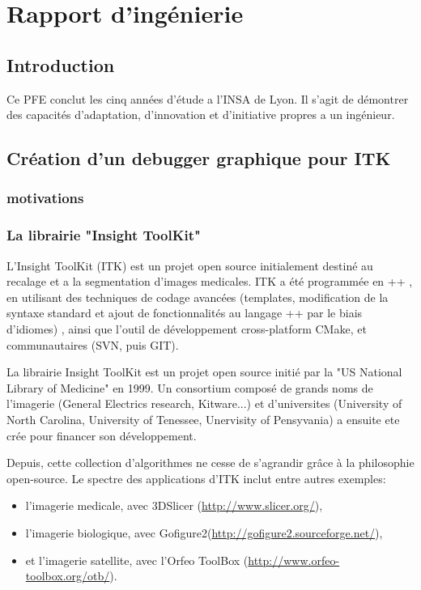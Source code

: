 

\chapter{Rapport d'ingénierie} 






\section{Introduction}

Ce PFE conclut les cinq années d'étude a l'INSA de Lyon. Il s'agit de démontrer des capacités d'adaptation, d'innovation et d'initiative propres a un ingénieur.
 
 
 
\section{Création d'un debugger graphique pour ITK}

\subsection{motivations}





\subsection{La librairie "Insight ToolKit"}
L'Insight ToolKit (ITK) est un projet open source initialement destiné au recalage et a la segmentation d'images medicales. ITK a été programmée en \C++ , en utilisant des techniques de codage avancées (templates, modification de la syntaxe standard et ajout de fonctionnalités au langage \C++ par le biais d'idiomes) , ainsi que l'outil de développement cross-platform CMake, et communautaires (SVN, puis GIT).

La librairie Insight ToolKit est un projet open source initié par la "US National Library of Medicine" en 1999. Un consortium composé de grands noms de l'imagerie (General Electrics research, Kitware...) et d'universites (University of North Carolina, University of Tenessee, Unervisity of Pensyvania) a ensuite ete crée pour financer son développement.

Depuis, cette collection d'algorithmes ne cesse de s'agrandir grâce à la philosophie open-source. Le spectre des applications d'ITK inclut entre autres exemples:  
\begin{itemize}
  \item l'imagerie medicale, avec 3DSlicer (\url{http://www.slicer.org/}),
  \item l'imagerie biologique, avec Gofigure2(\url{http://gofigure2.sourceforge.net/}),
  \item et l'imagerie satellite, avec l'Orfeo ToolBox (\url{http://www.orfeo-toolbox.org/otb/}).
\end{itemize}

